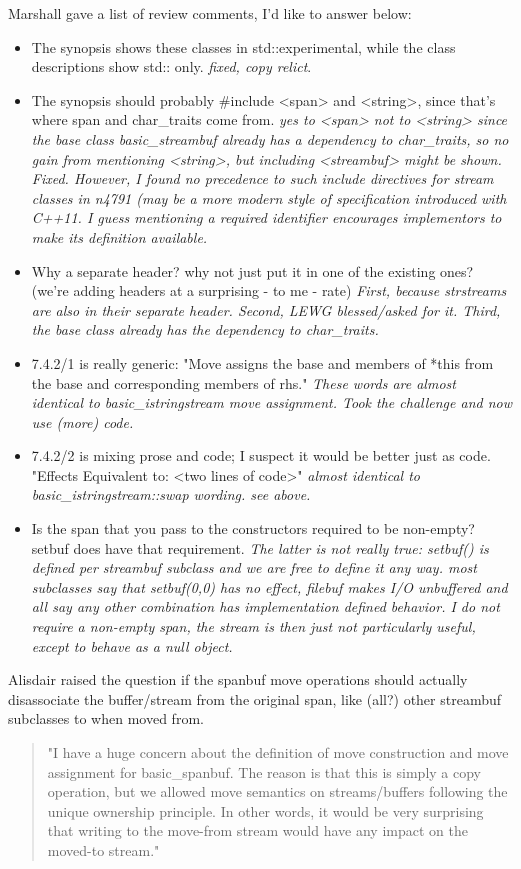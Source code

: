 \documentclass[ebook,11pt,article]{memoir}
\begin{document}
Marshall gave a list of review comments, I'd like to answer below:
\begin{itemize}

\item  
The synopsis shows these classes in std::experimental, while the class descriptions show std:: only.
\textit{fixed, copy relict}.
\item  
The synopsis should probably \#include <span> and <string>, since that's where span and char_traits come from.
\textit{yes to <span> not to <string> since the base class basic_streambuf already has a dependency to char_traits, so no gain from mentioning <string>, but including <streambuf> might be shown. Fixed. However, I found no precedence to such include directives for stream classes in n4791 (may be a more modern style of specification introduced with C++11. I guess mentioning a required identifier encourages implementors to make its definition available. }
\item Why a separate  header? why not just put it in one of the existing ones? 
       (we're adding headers at a surprising - to me - rate)
\textit{First, because strstreams are also in their separate header. Second, LEWG blessed/asked for it.
Third, the base class already has the dependency to char_traits.}
\item  7.4.2/1 is really generic: "Move assigns the base and members of *this from the base and corresponding members of rhs."
\textit{These words are almost identical to basic_istringstream move assignment. Took the challenge and now use (more) code.}
\item  7.4.2/2 is mixing prose and code; I suspect it would be better just as code. "Effects Equivalent to: <two lines of code>"
\textit{almost identical to basic_istringstream::swap wording. see above.}
\item  Is the span that you pass to the constructors required to be non-empty?  setbuf does have that requirement.
\textit{The latter is not really true: setbuf() is defined per streambuf subclass and we are free to define it any way. most subclasses say that setbuf(0,0) has no effect, filebuf makes I/O unbuffered and all say any other combination has implementation defined behavior. I do not require a non-empty span, the stream is then just not particularly useful, except to behave as a null object.}
\end{itemize}

Alisdair raised the question if the spanbuf move operations should actually disassociate the buffer/stream from the original span, like (all?) other streambuf subclasses to when moved from. 
\begin{quote}
{"I have a huge concern about the definition of move construction and move assignment
for basic_spanbuf.  The reason is that this is simply a copy operation, but we allowed
move semantics on streams/buffers following the unique ownership principle.  In other
words, it would be very surprising that writing to the move-from stream would have any
impact on the moved-to stream."}
\end{quote}
\end{document}
